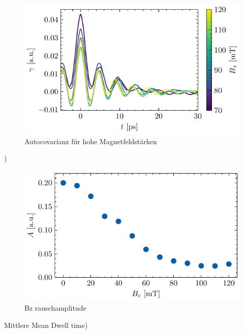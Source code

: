 \documentclass[main.tex]{subfiles}
\begin{document}



\begin{figure}[H]
    \centering
    \includegraphics{bilder/plots/max_Bz/autocov_high.pdf}
    \caption{Autocovarianz für hohe Magnetfeldstärken}\label{fig:bz-autocov-high}
\end{figure})



\begin{figure}[H]
    \centering
    \includegraphics{bilder/plots/max_Bz/rauschamplitude.pdf}
    \caption{Bz rauschamplitude  }\label{fig:bz-rauschampl}
\end{figure}Mittlere Mean Dwell time)


\end{document}
